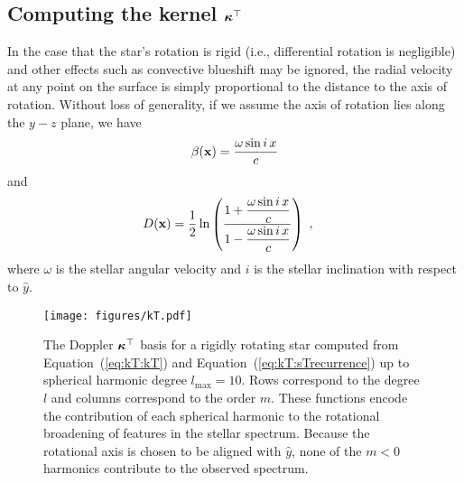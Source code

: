 \documentclass[modern]{aastex631}
\begin{document}
\subsection{Computing the kernel $\boldsymbol{\kappa}^\top$}
\label{sec:kT}
%
In the case that the star's rotation is rigid (i.e., differential rotation is negligible) and other effects such as convective blueshift may be ignored, the radial velocity at any point on the surface is simply proportional to the distance to the axis of rotation. 
Without loss of generality, if we assume the axis of rotation lies along the $y-z$ plane, we have
%
\begin{align}
    \label{eq:kT:beta}
    \beta({\mathbf{x}}) = \frac{\omega \sin i \, x}{c}
\end{align}
%
and
%
\begin{align}
    \label{eq:kT:D}
    D({\mathbf{x}}) & =
    \frac{1}{2}\ln\left(
    \dfrac{1 + \dfrac{\omega \sin i \, x}{c}}
    {1 - \dfrac{\omega \sin i \, x}{c}}
    \right)
    \hskip 0.33em ,
\end{align}
%
where $\omega$ is the stellar angular velocity and $i$ is the stellar inclination with respect to $\hat{y}$.

\begin{figure}[t!]
    \begin{centering}
        \texttt{[image: figures/kT.pdf]}
        \caption{%
            The Doppler $\boldsymbol{\kappa}^\top$ basis for a rigidly rotating star computed from Equation~(\ref{eq:kT:kT}) and Equation~(\ref{eq:kT:sTrecurrence}) up to spherical harmonic degree $l_\mathrm{max}=10$. 
            Rows correspond to the degree $l$ and columns correspond to the order $m$. 
            These functions encode the contribution of each spherical harmonic to the rotational broadening of features in the stellar spectrum. 
            Because the rotational axis is chosen to be aligned with $\hat{y}$, none of the $m < 0$ harmonics contribute to the observed spectrum.
        }
        \label{fig:kT}
    \end{centering}
\end{figure}
\end{document}
